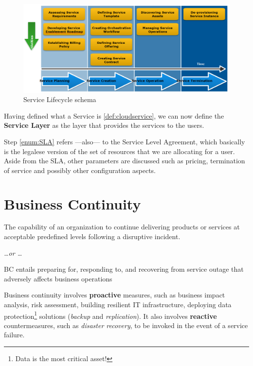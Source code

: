\begin{figure}[htbp]
   \centering
   \includegraphics{images/servicelifecycle.png}
   \caption{Service Lifecycle schema}
   \label{fig:servicelifecycle}
\end{figure}

Having defined what a Service is \ref{def:cloudservice}, we can now define the \textbf{Service Layer} as the layer that provides the services to the users.

Step \ref{enum:SLA} refers ---also--- to the Service Level Agreement, which basically is the legalese version of the set of resources that we are allocating for a user.\\
Aside from the SLA, other parameters are discussed such as pricing, termination of service and possibly other configuration aspects.


\section{Business Continuity}
\begin{definition}
   The capability of an organization to continue delivering products or services at acceptable predefined levels following a disruptive incident.

   \emph{\dots or \dots}
   
   BC entails preparing for, responding to, and recovering from service outage that adversely affects business operations
\end{definition}

Business continuity involves \textbf{proactive} measures, such as business impact analysis, risk assessment, building resilient IT infrastructure, deploying data protection\footnote{Data is the most critical asset!} solutions (\textit{backup} and \textit{replication}).
It also involves \textbf{reactive} countermeasures, such as \textit{disaster recovery}, to be invoked in the event of a service failure.



